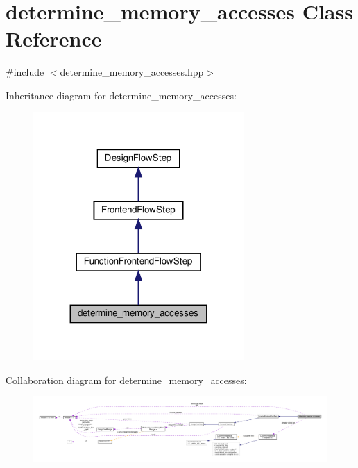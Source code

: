 \hypertarget{classdetermine__memory__accesses}{}\section{determine\+\_\+memory\+\_\+accesses Class Reference}
\label{classdetermine__memory__accesses}


{\ttfamily \#include $<$determine\+\_\+memory\+\_\+accesses.\+hpp$>$}



Inheritance diagram for determine\+\_\+memory\+\_\+accesses\+:
\nopagebreak
\begin{figure}[H]
\begin{center}
\leavevmode
\includegraphics[width=227pt]{d1/d68/classdetermine__memory__accesses__inherit__graph}
\end{center}
\end{figure}


Collaboration diagram for determine\+\_\+memory\+\_\+accesses\+:
\nopagebreak
\begin{figure}[H]
\begin{center}
\leavevmode
\includegraphics[width=350pt]{dc/d95/classdetermine__memory__accesses__coll__graph}
\end{center}
\end{figure}
